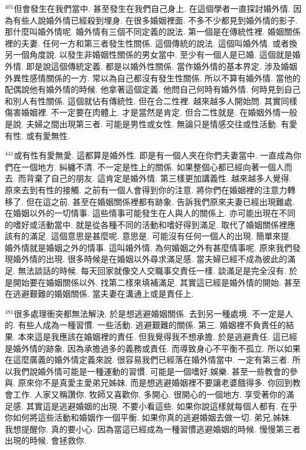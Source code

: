 \documentclass{book}
\begin{document}
$^{401}$但會發生在我們當中.
甚至發生在我們自己身上.
在這個學者一直探討婚外情.
因為有些人說婚外情已經殺到埋身.
在很多婚姻裡面.
不多不少都見到婚外情的影子.
那什麼叫婚外情呢.
婚外情有三個不同定義的說法.
第一個是在傳統性裡.
婚姻關係裡的夫妻.
任何一方和第三者發生性關係.
這個傳統的說法.
這個叫婚外情.
或者換另一個角度說.
以發生非婚姻性關係的男女當中.
至少有一個人是已婚.
這個就是婚外情.
即是說這個傳統定義.
都是以婚外性關係.
當作婚外情的基本界定.
涉及婚姻外異性感情關係的一方.
常以為自己都沒有發生性關係.
所以不算有婚外情.
當他的配偶說他有婚外情的時候.
他拿著這個定義.
他問自己何時有婚外情.
何時見到自己和別人有性關係.
這個就佔有傳統性.
但在合二性裡.
越來越多人開始問.
其實同樣傷害婚姻裡.
不一定要在肉體上.
才是當然是肯定.
但合二性就是.
在婚姻外情一般是說.
夫婦之間出現第三者.
可能是男性或女性.
無論只是情感交往或性活動.
有愛有性.
或有愛無性.

$^{441}$或有性有愛無愛.
這都算是婚外性.
即是有一個人夾在你們夫妻當中.
一直成為你們在一個地方.
糾纏不清.
不一定是性上的關係.
如果整個心都已經向著一個人而去.
而背棄了自己的朋友.
這肯定是婚外情.
第三樣更加講義性.
越來越多人覺得.
原來去到有性的接觸.
之前有一個人會得到你的注意.
將你們在婚姻裡的注意力轉移了.
但在這之前.
甚至在婚姻關係裡都有跡象.
告訴我們原來夫妻已經出現難處.
在婚姻以外的一切情事.
這些情事可能發生在人與人的關係上.
亦可能出現在不同的嗜好或活動當中.
就是從各種不同的活動和嗜好得到滿足.
取代了婚姻關係裡應該有的滿足.
這個意思是甚麼呢.
意思是.
可能沒有任何一個人的出現.
簡單來提.
婚外情就是婚姻之外的情事.
這叫婚外情.
為何婚姻之外有甚麼情事呢.
原來我們發現婚外情的出現.
很多時候是在婚姻以外尋求滿足感.
當夫婦已經不成為彼此的滿足.
無法談話的時候.
每天回家就像交人交職事交責任一樣.
談滿足是完全沒有.
於是開始要在婚姻關係以外.
找第二樣來填補滿足.
其實這已經是婚外情的開始.
甚至在逃避艱難的婚姻關係.
當夫妻在溝通上或是責任上.

$^{481}$很多處理衝突都無法解決.
於是想逃避婚姻關係.
去到另一種處境.
不一定是人的.
有些人成為一種習慣.
一些活動.
逃避艱難的關係.
第三.
婚姻裡不負責任的結果.
本來這是我應該在婚姻裡的責任.
但我覺得我不想承擔.
於是逃避責任.
這已經是婚外情的跡象.
因為承擔過多的義務或責任.
而導致身心不平衡不孤立.
所以如果在這麼廣義的婚外情定義來說.
很容易我們已經落在婚外情當中.
一定有第三者.
所以我們說婚外情可能是一種運動的習慣.
可能是一個嗜好,娛樂.
甚至一些教會的參與.
原來你不是真愛主愛弟兄姊妹.
而是想逃避婚姻裡不要讓老婆餓得多.
你回到教會工作.
人家又稱讚你.
牧師又喜歡你.
多開心.
很開心的一個地方.
享受著你的滿足感.
其實這是逃避婚姻的出現.
不要小看這些.
如果你說這樣就每個人都有.
在乎你如何將這些活動和婚姻作一個平衡.
如果你真的逃避婚姻去做一切.
弟兄,姊妹.
我想提醒你.
真的要小心.
因為當這已經成為一種習慣逃避婚姻的時候.
慢慢第三者出現的時候.
會拯救你.
\end{document}

